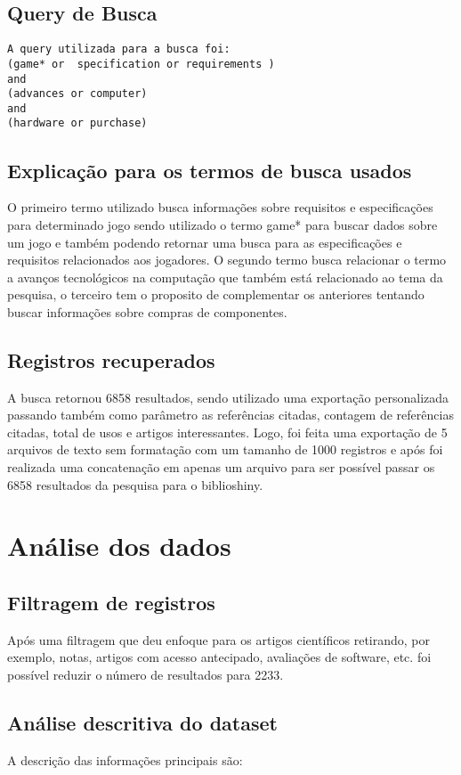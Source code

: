 \subsection{Query de Busca}
\begin{verbatim}
A query utilizada para a busca foi:
(game* or  specification or requirements ) 
and 
(advances or computer) 
and 
(hardware or purchase)
\end{verbatim}

\subsection{Explicação para os termos de busca usados}

O primeiro termo utilizado busca informações sobre requisitos e especificações para determinado jogo sendo utilizado o termo game* para buscar dados sobre um jogo e também podendo retornar uma busca para as especificações e requisitos relacionados aos jogadores. O segundo termo busca relacionar o termo a avanços tecnológicos na computação que também está relacionado ao tema da pesquisa, o terceiro tem o proposito de complementar os anteriores tentando buscar informações sobre compras de componentes.

\subsection{Registros recuperados}

A busca retornou 6858 resultados, sendo utilizado uma exportação personalizada passando também como parâmetro as referências citadas, contagem de referências citadas, total de usos e artigos interessantes. Logo, foi feita uma exportação de 5 arquivos de texto sem formatação com um tamanho de 1000 registros e após foi realizada uma concatenação em apenas um arquivo para ser possível passar os 6858 resultados da pesquisa para o biblioshiny.

\section{Análise dos dados}

\subsection{Filtragem de registros}
Após uma filtragem que deu enfoque para os artigos científicos retirando, por exemplo, notas, artigos com acesso antecipado, avaliações de software, etc. foi possível reduzir o número de resultados para 2233.

\subsection{Análise descritiva do dataset}

A descrição das informações principais são:
 \item [\textit{]